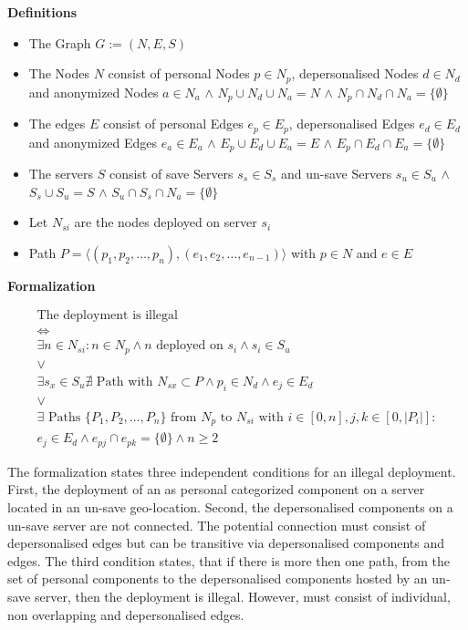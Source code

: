 \begin{description}
	\item{\textbf{Definitions}}
	\begin{itemize}
		\item The Graph $G := (N, E, S)$ 
		\item The Nodes $N$ consist of personal Nodes $p \in N_p$, depersonalised Nodes $d \in N_d$ and anonymized Nodes $a \in N_a$ $\wedge$ $N_p \cup N_d \cup N_a = N$ $\wedge$ $N_p \cap N_d \cap N_a = \{ \emptyset \} $
		\item The edges $E$ consist of personal Edges $e_p \in E_p$, depersonalised Edges $e_d \in E_d$ and anonymized Edges $e_a \in E_a$ $\wedge$ $E_p \cup E_d \cup E_a = E$ $\wedge$ $E_p \cap E_d \cap E_a = \{ \emptyset \} $  
		\item The servers $S$ consist of save Servers $s_s \in S_s$ and un-save Servers $s_u \in S_u$ $\wedge$ $S_s \cup S_u = S$ $\wedge$ $S_u \cap S_s \cap N_a = \{ \emptyset \} $
		\item Let $N_{si}$ are the nodes deployed on server $s_i$
		\item Path $P = \langle(p_1, p_2, \dots, p_n), (e_1, e_2, \dots, e_{n-1})\rangle$ with $p \in N$ and $e \in E$
	\end{itemize}
	
	\item{\textbf{Formalization}}
\end{description}
\begin{gather*}
	\textrm{The deployment is illegal}\\
	\Leftrightarrow\\
	\exists n \in N_{si}: n \in N_p \wedge n \textrm{ deployed on } s_i \wedge s_i \in S_u \\
	\vee\\
	\exists s_x \in S_u \nexists \textrm{ Path  with } N_{sx} \subset P \wedge p_i \in N_d \wedge e_j \in E_d \\
	\vee \\
	\exists \textrm{ Paths } \{P_1, P_2, \dots, P_n\} \textrm{ from } N_p \textrm{ to } N_{si} \textrm{ with } i \in [0, n], j, k \in [0,|P_i|]: \\
	e_j \in E_d \wedge e_{pj} \cap e_{pk} = \{ \emptyset \} \wedge n \geq 2 
\end{gather*}

The formalization states three independent conditions for an illegal deployment. First, the deployment of an as personal categorized component on a server located in an un-save geo-location. Second, the depersonalised components on a un-save server are not connected. The potential connection must consist of depersonalised edges but can be transitive via depersonalised components and edges. The third condition states, that if there is more then one path, from the set of personal components to the depersonalised components hosted by an un-save server, then the deployment is illegal. However, must consist of individual, non overlapping and depersonalised edges.

